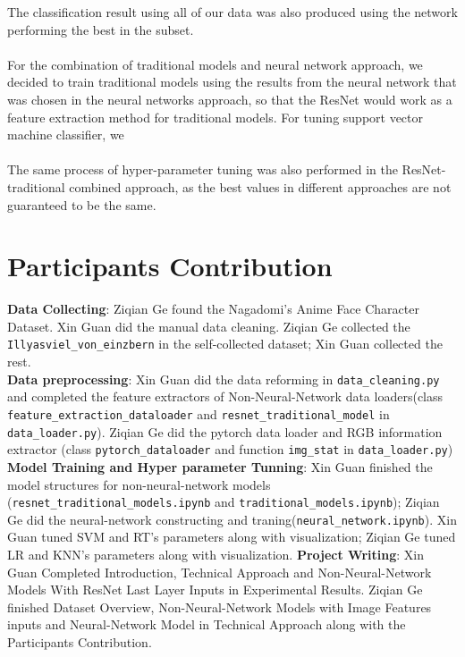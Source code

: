 \documentclass[11.5pt]{article}
\begin{document}
    The classification result using all of our data was also produced using the network performing the best in the subset.\\ \\
    For the combination of traditional models and neural network approach, we decided to train traditional models using the results from the neural network that was chosen in the neural networks approach, so that the ResNet would work as a feature extraction method for traditional models.
    For tuning support vector machine classifier, we \\ \\
    The same process of hyper-parameter tuning was also performed in the ResNet-traditional combined approach, as the best values in different approaches are not guaranteed to be the same.


    \section{Participants Contribution}
    \textbf{Data Collecting}: Ziqian Ge found the Nagadomi's Anime Face Character Dataset. Xin Guan did the manual data cleaning. Ziqian Ge collected the \texttt{Illyasviel\_von\_einzbern} in the self-collected dataset; Xin Guan collected the rest. \\
    \textbf{Data preprocessing}: Xin Guan did the data reforming in \texttt{data\_cleaning.py} and completed the feature extractors of Non-Neural-Network data loaders(class \texttt{feature\_extraction\_dataloader} and \texttt{resnet\_traditional\_model} in \texttt{data\_loader.py}). Ziqian Ge did the pytorch data loader and RGB information extractor (class \texttt{pytorch\_dataloader} and function \texttt{img\_stat} in \texttt{data\_loader.py}) 
    \vspace{10mm}
    \textbf{Model Training and Hyper parameter Tunning}: Xin Guan finished the model structures for non-neural-network models (\texttt{resnet\_traditional\_models.ipynb} and \texttt{traditional\_models.ipynb}); Ziqian Ge did the neural-network constructing and traning(\texttt{neural\_network.ipynb}). Xin Guan tuned SVM and RT's parameters along with visualization; Ziqian Ge tuned LR and KNN's parameters along with visualization.
    \textbf{Project Writing}: Xin Guan Completed Introduction, Technical Approach and Non-Neural-Network Models With ResNet Last Layer Inputs in Experimental Results. Ziqian Ge finished Dataset Overview, Non-Neural-Network Models with Image Features inputs and Neural-Network Model in Technical Approach along with the Participants Contribution.
    \vspace{10mm}


    \newpage
    
    {}
    

    
\end{document}
